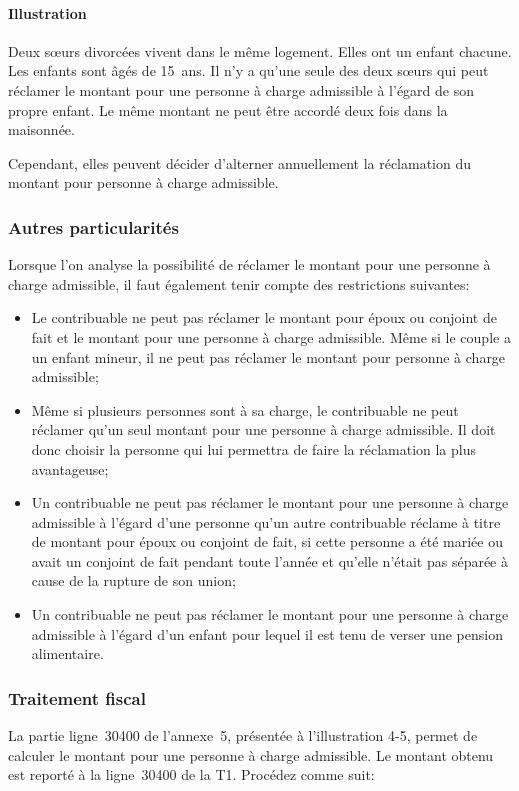 \paragraph{Illustration}
Deux sœurs divorcées vivent dans le même logement. Elles ont un enfant chacune. Les enfants sont âgés de 15~ans. Il n'y a qu'une seule des deux sœurs qui peut réclamer le montant pour une personne à charge admissible à l'égard de son propre enfant. Le même montant ne peut être accordé deux fois dans la maisonnée.

Cependant, elles peuvent décider d'alterner annuellement la réclamation du montant pour personne à charge admissible.

\subsubsection{Autres particularités}
Lorsque l'on analyse la possibilité de réclamer le montant pour une personne à charge admissible, il faut également tenir compte des restrictions
suivantes:
\begin{itemize}
	\item Le contribuable ne peut pas réclamer le montant pour époux ou conjoint de fait et le montant pour une personne à charge admissible. Même si le couple a un enfant mineur, il ne peut pas réclamer le montant pour personne à charge admissible;
	\item Même si plusieurs personnes sont à sa charge, le contribuable ne peut réclamer qu'un seul montant pour une personne à charge admissible. Il doit donc choisir la personne qui lui permettra de faire la réclamation la plus avantageuse;
	\item Un contribuable ne peut pas réclamer le montant pour une personne à charge admissible à l'égard d'une personne qu'un autre contribuable réclame à titre de montant pour époux ou conjoint de fait, si cette personne a été mariée ou avait un conjoint de fait pendant toute l'année et qu'elle n'était pas séparée à cause de la rupture de son union;
	\item Un contribuable ne peut pas réclamer le montant pour une personne à charge admissible à l'égard d'un enfant pour lequel il est tenu de verser une pension alimentaire.
\end{itemize}

\subsubsection{Traitement fiscal}
La partie \og ligne~30400 \fg{} de l'annexe~5, présentée à l'illustration 4-5, permet de calculer le montant pour une personne à charge admissible. Le montant obtenu est reporté à la ligne~30400 de la T1. Procédez comme suit:

